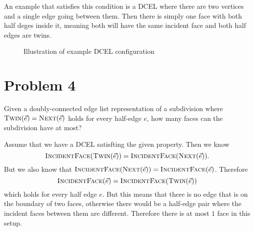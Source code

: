 \documentclass[12pt]{extarticle}
\begin{document}
\begin{solution}
    An example that satisfies this condition is a DCEL where there are two vertices and a single edge going between them. Then there is simply one face with both half deges inside it, meaning both will have the same incident face and both half edges are twins.
    \begin{figure}[H]
        \centering
        \caption{Illustration of example DCEL configuration}
    \end{figure}
\end{solution}

\section*{Problem 4}
Given a doubly-connected edge list representation of a subdivision where $\textsc{Twin}(\vec{e}) = \textsc{Next}(\vec{e})$ holds for every half-edge $e$, how many faces can the subdivision have at most?

\begin{solution}
    Assume that we have a DCEL satisfting the given property. Then we know
    \[
        \textsc{IncidentFace}(\textsc{Twin}(\vec{e})) = 
        \textsc{IncidentFace}(\textsc{Next}(\vec{e})) 
    .\]
    But we also know that $ \textsc{IncidentFace}(\textsc{Next}(\vec{e})) = \textsc{IncidentFace}(\vec{e})$. Therefore
    \[
        \textsc{IncidentFace}(\vec{e}) = 
        \textsc{IncidentFace}(\textsc{Twin}(\vec{e})) 
    \]
    which holds for every half edge $e$. But this means that there is no edge that is on the boundary of two faces, otherwise there would be a half-edge pair where the incident faces between them are different. Therefore there is at most $1$ face in this setup.
\end{solution}
\end{document}
